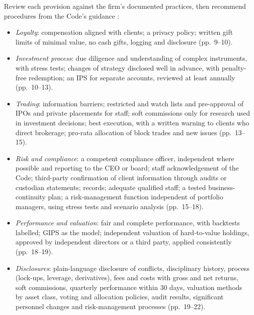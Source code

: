 \begin{qfmethod}\label{meth:asset-manager-code-compliance}
 Review each provision against the firm's documented practices, then recommend procedures from the Code's guidance \citep[pp.~9--22]{asset-manager-code-2010}:
\begin{itemize}
\item \emph{Loyalty}: compensation aligned with clients; a privacy policy; written gift limits of minimal value, no cash gifts, logging and disclosure (pp.~9--10).
\item \emph{Investment process}: due diligence and understanding of complex instruments, with stress tests; changes of strategy disclosed well in advance, with penalty-free redemption; an IPS for separate accounts, reviewed at least annually (pp.~10--13).
\item \emph{Trading}: information barriers; restricted and watch lists and pre-approval of IPOs and private placements for staff; soft commissions only for research used in investment decisions; best execution, with a written warning to clients who direct brokerage; pro-rata allocation of block trades and new issues (pp.~13--15).
\item \emph{Risk and compliance}: a competent compliance officer, independent where possible and reporting to the CEO or board; staff acknowledgement of the Code; third-party confirmation of client information through audits or custodian statements; records; adequate qualified staff; a tested business-continuity plan; a risk-management function independent of portfolio managers, using stress tests and scenario analysis (pp.~15--18).
\item \emph{Performance and valuation}: fair and complete performance, with backtests labelled; GIPS as the model; independent valuation of hard-to-value holdings, approved by independent directors or a third party, applied consistently (pp.~18--19).
\item \emph{Disclosures}: plain-language disclosure of conflicts, disciplinary history, process (lock-ups, leverage, derivatives), fees and costs with gross and net returns, soft commissions, quarterly performance within 30 days, valuation methods by asset class, voting and allocation policies, audit results, significant personnel changes and risk-management processes (pp.~19--22).
\end{itemize}


\end{qfmethod}
